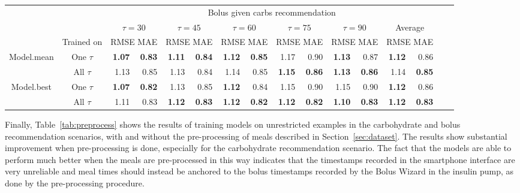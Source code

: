 \documentclass[graybox]{svmult}
\begin{document}
\begin{table}
\begin{center}
\begin{tabular}{|c|c|rr|rr|rr|rr|rr|rr|rr}
    \cline{3-14}
    \multicolumn{2}{c|}{} & \multicolumn{12}{c|}{Bolus given carbs recommendation}\\
    \cline{3-14}
    \multicolumn{2}{c|}{} & \multicolumn{2}{c|}{$\tau=30$} & \multicolumn{2}{c|}{$\tau=45$} & \multicolumn{2}{c|}{$\tau=60$} & \multicolumn{2}{c|}{$\tau=75$} & \multicolumn{2}{c|}{$\tau=90$} & \multicolumn{2}{c|}{Average}\\
    \cline{2-14}
     \multicolumn{1}{c|}{}& Trained on & \multicolumn{2}{c|}{\scriptsize RMSE MAE} & \multicolumn{2}{c|}{\scriptsize RMSE MAE} & \multicolumn{2}{c|}{\scriptsize RMSE MAE} & \multicolumn{2}{c|}{\scriptsize RMSE MAE} & \multicolumn{2}{c|}{\scriptsize RMSE MAE} & \multicolumn{2}{c|}{\scriptsize RMSE MAE} \\
    \hline
    \multirow{2}{*}{Model.mean} & One $\tau$ & \textbf{1.07} & \textbf{0.83} & \textbf{1.11} & \textbf{0.84} & \textbf{1.12} & \textbf{0.85} & 1.17 & 0.90 & \textbf{1.13} & 0.87 & \textbf{1.12} & 0.86\\
    & All $\tau$ & 1.13 & 0.85 & 1.13 & 0.84 & 1.14 & 0.85 & \textbf{1.15} & \textbf{0.86} & \textbf{1.13} & \textbf{0.86} & 1.14 & \textbf{0.85}\\
    \hline
    \multirow{2}{*}{Model.best} & One $\tau$ & \textbf{1.07} & \textbf{0.82} & 1.13 & 0.85 & \textbf{1.12} & 0.84 & 1.15 & 0.90 & 1.15 & 0.90 & \textbf{1.12} & 0.86\\
    & All $\tau$ & 1.11 & 0.83 &\textbf{1.12} & \textbf{0.83} & \textbf{1.12} & \textbf{0.82} & \textbf{1.12} & \textbf{0.82} & \textbf{1.10} & \textbf{0.83} & \textbf{1.12} & \textbf{0.83}\\
    \hline

\end{tabular}
\end{center}
\end{table}

Finally, Table~\ref{tab:preprocess} shows the results of training models on unrestricted examples in the carbohydrate and bolus recommendation scenarios, with and without the pre-processing of meals described in Section~\ref{sec:dataset}. The results show substantial improvement when pre-processing is done, especially for the carbohydrate recommendation scenario. The fact that the models are able to perform much better when the meals are pre-processed in this way indicates that the timestamps recorded in the smartphone interface are very unreliable and meal times should instead be anchored to the bolus timestamps recorded by the Bolus Wizard in the insulin pump, as done by the pre-processing procedure.
\end{document}

